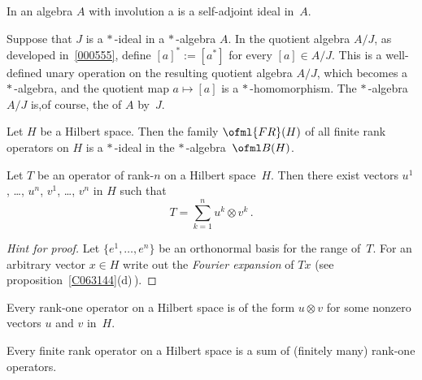 \begin{defn} In an algebra $A$ with involution
a  is a self-adjoint ideal in~$A$.
\end{defn}

\begin{prop}\label{0010953} Suppose that $J$ is a $*\,$-ideal in a $*\,$-algebra $A$.  In the quotient
algebra $A/J$, as developed in~\ref{000555}, define $[a]^* := [a^*]$ for every $[a] \in A/J$.
This is a well-defined unary operation on the resulting quotient algebra $A/J$, which becomes a $*\,$-algebra, and the
quotient map $a \mapsto [a]$ is a $*\,$-homomorphism. The $*\,$-algebra $A/J$ is,of
course, the
 of $A$ by~$J$.
\end{prop}

\begin{prop} Let $H$ be a Hilbert space. Then the family $\ofml{FR}(H)$ of all finite rank operators on $H$
is a $*\,$-ideal in the $*\,$-algebra~$\ofml B(H)$.
\end{prop}

\begin{prop}\label{prop_frop_sum_rnk1} Let $T$ be an operator of rank-$n$ on a Hilbert space~$H$. Then there exist
vectors $u^1$, \dots, $u^n$, $v^1$, \dots, $v^n$ in $H$ such that
   \[ T = \sum_{k=1}^n u^k \otimes v^k\,. \]
\end{prop}

\begin{proof}[\emph{Hint for proof}] Let $\{e^1, \dots, e^n\}$ be an orthonormal basis for the range of~$T$.  For an
arbitrary vector $x \in H$ write out the \emph{Fourier expansion} of $Tx$ (see proposition~\ref{C063144}(d)\,).  \ns
\end{proof}

\begin{cor} Every rank-one operator on a Hilbert space is of the form $u \otimes v$ for some nonzero vectors
$u$ and $v$ in~$H$.
\end{cor}

\begin{cor} Every finite rank operator on a Hilbert space is a sum of (finitely many) rank-one operators.
\end{cor}

